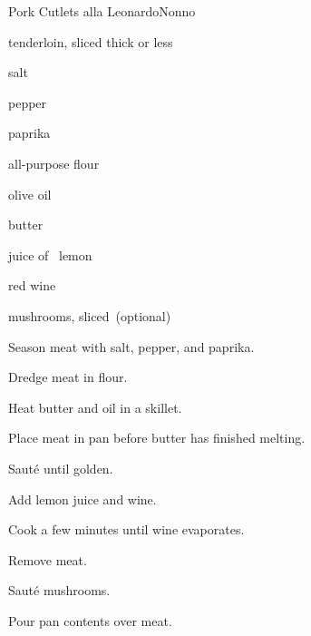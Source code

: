 \begin{recipe}{Pork Cutlets alla Leonardo}{Nonno}{}

\begin{ingredients}
\item {} tenderloin, sliced \inch{\quarter} thick or less
\item salt
\item pepper
\item paprika
\item all-purpose flour
\item olive oil
\item {} butter
\item juice of \half{}~lemon
\item \C{\half} red wine
\item mushrooms, sliced~(optional)
\end{ingredients}

\begin{directions}
\item Season meat with salt, pepper, and paprika.
\item Dredge meat in flour.
\item Heat butter and oil in a skillet.
\item Place meat in pan before butter has finished melting.
\item Saut\'e until golden.
\item Add lemon juice and wine.
\item Cook a few minutes until wine evaporates.
\item Remove meat.
\item Saut\'e mushrooms.
\item Pour pan contents over meat.
\end{directions}

\end{recipe}
